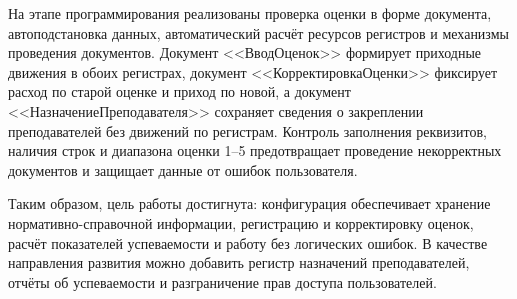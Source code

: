 \documentclass[14pt,a4paper]{extarticle}
\begin{document}
На этапе программирования реализованы проверка оценки в форме документа,
автоподстановка данных, автоматический расчёт ресурсов регистров и механизмы
проведения документов. Документ <<ВводОценок>> формирует приходные движения в
обоих регистрах, документ <<КорректировкаОценки>> фиксирует расход по старой
оценке и приход по новой, а документ <<НазначениеПреподавателя>> сохраняет
сведения о закреплении преподавателей без движений по регистрам. Контроль
заполнения реквизитов, наличия строк и диапазона оценки 1--5 предотвращает
проведение некорректных документов и защищает данные от ошибок пользователя.

Таким образом, цель работы достигнута: конфигурация обеспечивает хранение
нормативно-справочной информации, регистрацию и корректировку оценок, расчёт
показателей успеваемости и работу без логических ошибок. В качестве направления
развития можно добавить регистр назначений преподавателей, отчёты об
успеваемости и разграничение прав доступа пользователей.
\end{document}
